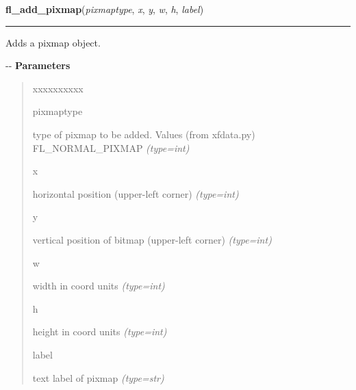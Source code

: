     \label{xformslib:flbitmap:fl_add_pixmap}

    \vspace{0.5ex}

\hspace{.8\funcindent}\begin{boxedminipage}{\funcwidth}

    \raggedright \textbf{fl\_add\_pixmap}(\textit{pixmaptype}, \textit{x}, \textit{y}, \textit{w}, \textit{h}, \textit{label})

    \vspace{-1.5ex}

    \rule{\textwidth}{0.5\fboxrule}
\setlength{\parskip}{2ex}

Adds a pixmap object.

-{}-
\setlength{\parskip}{1ex}
      \textbf{Parameters}
      \vspace{-1ex}

      \begin{quote}
        \begin{Ventry}{xxxxxxxxxx}

          \item[pixmaptype]


type of pixmap to be added. Values (from xfdata.py) FL\_NORMAL\_PIXMAP
            {\it (type=int)}

          \item[x]


horizontal position (upper-left corner)
            {\it (type=int)}

          \item[y]


vertical position of bitmap (upper-left corner)
            {\it (type=int)}

          \item[w]


width in coord units
            {\it (type=int)}

          \item[h]


height in coord units
            {\it (type=int)}

          \item[label]


text label of pixmap
            {\it (type=str)}

        \end{Ventry}


\end{quote}
\end{boxedminipage}
